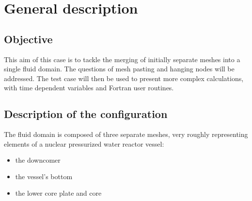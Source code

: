 %
% 
%
% 
% 
% 
%
\section{General description}

	\subsection{Objective}

This aim of this case is to tackle the merging of initially separate meshes into
a single fluid domain. The questions of mesh pasting and hanging nodes will be
addressed. The test case will then be used to present more complex calculations,
with time dependent variables and Fortran user routines.


	\subsection{Description of the configuration}

The fluid domain is composed of three separate meshes, very roughly representing
elements of a nuclear pressurized water reactor vessel: 
\begin{itemize}
	\item the downcomer
	\item the vessel's bottom
	\item the lower core plate and core 
\end{itemize}

